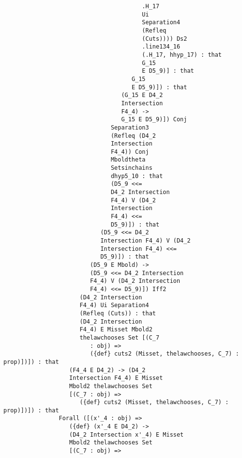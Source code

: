 \documentclass[12pt]{article}
\begin{document}
\begin{verbatim}
                                        .H_17 
                                        Ui 
                                        Separation4 
                                        (Refleq 
                                        (Cuts)))) Ds2 
                                        .line134_16 
                                        (.H_17, hhyp_17) : that 
                                        G_15 
                                        E D5_9)] : that 
                                     G_15 
                                     E D5_9)]) : that 
                                  (G_15 E D4_2 
                                  Intersection 
                                  F4_4) -> 
                                  G_15 E D5_9)]) Conj 
                               Separation3 
                               (Refleq (D4_2 
                               Intersection 
                               F4_4)) Conj 
                               Mboldtheta 
                               Setsinchains 
                               dhyp5_10 : that 
                               (D5_9 <<= 
                               D4_2 Intersection 
                               F4_4) V (D4_2 
                               Intersection 
                               F4_4) <<= 
                               D5_9)]) : that 
                            (D5_9 <<= D4_2 
                            Intersection F4_4) V (D4_2 
                            Intersection F4_4) <<= 
                            D5_9)]) : that 
                         (D5_9 E Mbold) -> 
                         (D5_9 <<= D4_2 Intersection 
                         F4_4) V (D4_2 Intersection 
                         F4_4) <<= D5_9)]) Iff2 
                      (D4_2 Intersection 
                      F4_4) Ui Separation4 
                      (Refleq (Cuts)) : that 
                      (D4_2 Intersection 
                      F4_4) E Misset Mbold2 
                      thelawchooses Set [(C_7 
                         : obj) => 
                         ({def} cuts2 (Misset, thelawchooses, C_7) : prop)])]) : that 
                   (F4_4 E D4_2) -> (D4_2 
                   Intersection F4_4) E Misset 
                   Mbold2 thelawchooses Set 
                   [(C_7 : obj) => 
                      ({def} cuts2 (Misset, thelawchooses, C_7) : prop)])]) : that 
                Forall ([(x'_4 : obj) => 
                   ({def} (x'_4 E D4_2) -> 
                   (D4_2 Intersection x'_4) E Misset 
                   Mbold2 thelawchooses Set 
                   [(C_7 : obj) => 

\end{verbatim}
\end{document}
